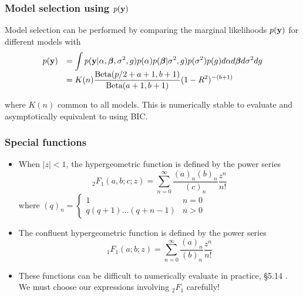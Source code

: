 \documentclass{beamer}
\begin{document}
\begin{frame}
	\frametitle{Model selection using $p({\bf y})$}
	Model selection can be performed by comparing the marginal likelihoods $p({\bf y})$ for different models with
	$$
	\begin{array}{rl}
	p({\bf y}) 
	& \displaystyle = \int p({\bf y}|\alpha,{\boldsymbol \beta},\sigma^2,g)p(\alpha)p({\boldsymbol \beta}|\sigma^2,g)p(\sigma^2)p(g) d\alpha d{\boldsymbol \beta} d\sigma^2 dg
	\\
	& \displaystyle 
	=  K(n)
	\frac{\mbox{Beta}(p/2 + a + 1,b + 1)}{\mbox{Beta}(a+1,b+1)} (1 - R^2)^{-(b + 1)}
	\end{array} 
	$$

	\noindent where $K(n)$ common to all models.
	This is numerically stable to evaluate
	and asymptotically equivalent to using BIC.
\end{frame}


\begin{frame}
	\frametitle{Special functions}
	\begin{itemize}
		\item When $|z| < 1$, the hypergeometric function is defined by the power series
					\[
						{}_2 F_1 (a, b; c; z) = \sum_{n=0}^\infty \frac{(a)_n (b)_n}{(c)_n} \frac{z^n}{n!}
					\]
					where
					$(q)_n = \begin{cases}
						1 & n = 0 \\
						q (q + 1) \ldots (q + n - 1) & n > 0
					\end{cases}$
		\item The confluent hypergeometric function is defined by the power series
					\[
						{}_1 F_1 (a; b; z) = \sum_{n=0}^\infty \frac{(a)_n}{(b)_n} \frac{z^n}{n!}
					\]
		\item These functions can be difficult to numerically evaluate in practice, \S 5.14 \cite{Press:2007:NRE:1403886}.
					We must choose our expressions involving ${}_2 F_1$ carefully!
	\end{itemize}
\end{frame}

\end{document}

